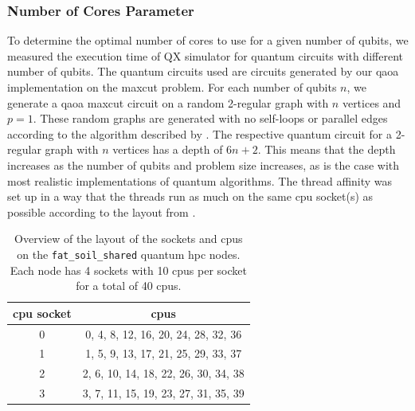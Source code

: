 \subsubsection{Number of Cores Parameter}
To determine the optimal number of cores to use for a given number of qubits, we measured the execution time of QX simulator for quantum circuits with different number of qubits.
The quantum circuits used are circuits generated by our \gls{qaoa} implementation on the \gls{maxcut} problem.
For each number of qubits $n$, we generate a \gls{qaoa} \gls{maxcut} circuit on a random 2-regular graph with $n$ vertices and $p = 1$.
These random graphs are generated with no self-loops or parallel edges according to the algorithm described by \textcite{steger1999generating}.
The respective quantum circuit for a 2-regular graph with $n$ vertices has a depth of $6n + 2$.
This means that the depth increases as the number of qubits and problem size increases, as is the case with most realistic implementations of quantum algorithms.
The thread affinity was set up in a way that the threads run as much on the same \gls{cpu} socket(s) as possible according to the layout from .
\begin{table}[ht]
    \centering
    {\renewcommand{\arraystretch}{1.15}
        \begin{tabular}{c|c}
            \gls{cpu} socket & \glspl{cpu} \\
            \hline
            0 & 0, 4, 8, 12, 16, 20, 24, 28, 32, 36 \\
            1 & 1, 5, 9, 13, 17, 21, 25, 29, 33, 37 \\
            2 & 2, 6, 10, 14, 18, 22, 26, 30, 34, 38 \\
            3 & 3, 7, 11, 15, 19, 23, 27, 31, 35, 39 \\
        \end{tabular}
    }
    \caption[Overview of the layout of the sockets and \glspl{cpu} on the \texttt{fat_soil_shared} quantum \gls{hpc} nodes.]{
        Overview of the layout of the sockets and \glspl{cpu} on the \texttt{fat_soil_shared} quantum \gls{hpc} nodes.
        Each node has 4 sockets with 10 \glspl{cpu} per socket for a total of 40 \glspl{cpu}.
    }
    \label{table:fat-soil-affinities}
\end{table}

